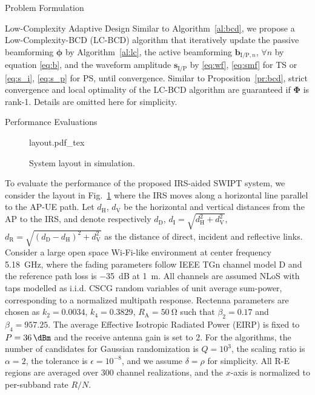 \documentclass[journal]{IEEEtran}
\begin{document}
\begin{section}{Problem Formulation}
\begin{subsection}{Low-Complexity Adaptive Design}
			Similar to Algorithm~\ref{al:bcd}, we propose a Low-Complexity-BCD (LC-BCD) algorithm that iteratively update the passive beamforming $\boldsymbol{\phi}$ by Algorithm~\ref{al:lc}, the active beamforming $\boldsymbol{b}_{\mathrm{I/P},n}$, $\forall n$ by equation \eqref{eq:b}, and the waveform amplitude $\boldsymbol{s}_{\mathrm{I/P}}$ by \eqref{eq:wf}, \eqref{eq:smf} for TS or \eqref{eq:s_i}, \eqref{eq:s_p} for PS, until convergence. Similar to Proposition~\ref{pr:bcd}, strict convergence and local optimality of the LC-BCD algorithm are guaranteed if $\boldsymbol{\Phi}$ is rank-\num{1}. Details are omitted here for simplicity.
		\end{subsection}
	\end{section}


	\begin{section}{Performance Evaluations}\label{se:performance_evaluation}
		\begin{figure}[!t]
			\centering
			\def\svgwidth{0.9\columnwidth}
			{layout.pdf_tex}
			\caption{System layout in simulation.}
			\label{fi:layout}
		\end{figure}
		To evaluate the performance of the proposed IRS-aided SWIPT system, we consider the layout in Fig.~\ref{fi:layout} where the IRS moves along a horizontal line parallel to the AP-UE path. Let $d_{\mathrm{H}}$, $d_{\mathrm{V}}$ be the horizontal and vertical distances from the AP to the IRS, and denote respectively $d_{\mathrm{D}}$, $d_{\mathrm{I}}=\sqrt{d_{\mathrm{H}}^2+d_{\mathrm{V}}^2}$, $d_{\mathrm{R}}=\sqrt{(d_{\mathrm{D}}-d_{\mathrm{H}})^2+d_{\mathrm{V}}^2}$ as the distance of direct, incident and reflective links. Consider a large open space Wi-Fi-like environment at center frequency \SI{5.18}{\GHz}, where the fading parameters follow IEEE TGn channel model D \cite{Erceg2004} and the reference path loss is \SI{-35}{\dB} at \SI{1}{\meter}. All channels are assumed NLoS with taps modelled as i.i.d. CSCG random variables of unit average sum-power, corresponding to a normalized multipath response. Rectenna parameters are chosen as $k_2=0.0034$, $k_4=0.3829$, $R_{\mathrm{A}}=\SI{50}{\ohm}$ such that $\beta_2=0.17$ and $\beta_4=957.25$. The average Effective Isotropic Radiated Power (EIRP) is fixed to $P=\SI{36}{\dBm}$ and the receive antenna gain is set to \SI{2}{\dBi}. For the algorithms, the number of candidates for Gaussian randomization is $Q=10^{3}$, the scaling ratio is $\alpha=2$, the tolerance is $\epsilon=10^{-8}$, and we assume $\delta=\rho$ for simplicity. All R-E regions are averaged over \num{300} channel realizations, and the $x$-axis is normalized to per-subband rate $R/N$.


\end{section}
\end{document}
